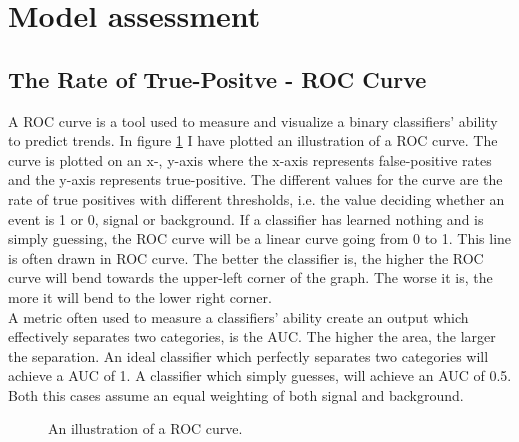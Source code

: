 \section{Model assessment}\label{subsec:Cost}
\subsection{The Rate of True-Positve - ROC Curve}\label{subsec:AUC}
A \ac{ROC} curve is a tool used to measure and visualize a binary classifiers' ability 
to predict trends. In figure \ref{fig:ROC} I have plotted an illustration of a \ac{ROC} curve.
The curve is plotted on an x-, y-axis where the x-axis represents 
false-positive rates and the y-axis represents true-positive. The different values 
for the curve are the rate of true positives with different thresholds, i.e. 
the value deciding whether an event is 1 or 0, signal or background. If a classifier 
has learned nothing and is simply guessing, the \ac{ROC} curve will be a linear curve 
going from 0 to 1. This line is often drawn in \ac{ROC} curve. The better the 
classifier is, the higher the \ac{ROC} curve will bend towards the upper-left corner of the 
graph. The worse it is, the more it will bend to the lower right corner. 
\\
A metric often used to measure a classifiers' ability create an output which effectively 
separates two categories, is the \ac{AUC}. The higher the area, the larger the separation. 
An ideal classifier which perfectly separates two categories will achieve a \ac{AUC} of 1.
A classifier which simply guesses, will achieve an \ac{AUC} of 0.5. Both this cases assume 
an equal weighting of both signal and background. 
\begin{figure}
    \centering
    \caption{An illustration of a ROC curve.}
    \label{fig:ROC}
\end{figure}

